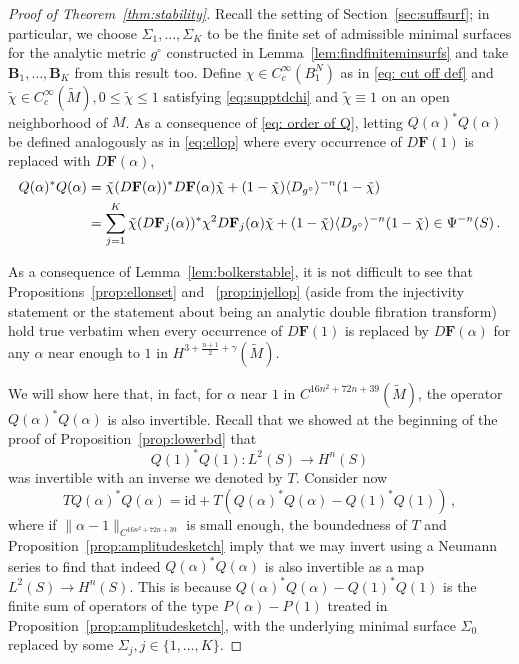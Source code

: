 \documentclass[11pt]{amsart}
\theoremstyle{definition}
\numberwithin{equation}{section}
\newcommand{\norm}[1]{\lVert #1 \rVert}         %
\newcommand{\BB}{\mathbf B}
\begin{document}
\begin{proof}[Proof of Theorem~\ref{thm:stability}]
Recall the setting of Section~\ref{sec:suffsurf}; in particular, we choose $\Sigma_1,\dots,\Sigma_K$ to be the finite set of admissible minimal surfaces for the analytic metric $g^\circ$ constructed in Lemma~\ref{lem:findfiniteminsurfs} and take $\BB_1,\dots,\BB_K$ from this result too. %
Define $\chi\in C^\infty_c(B_1^{N})$ as in \eqref{eq: cut off def} and $\tilde\chi\in C^\infty_c(\widetilde M), 0\leq \tilde{\chi}\leq 1$ satisfying \eqref{eq:supptdchi} and $\tilde{\chi}\equiv 1$ on an open neighborhood of $M$. As a consequence of \eqref{eq: order of Q}, letting $Q(\alpha)^\ast Q(\alpha)$ be defined analogously as in \eqref{eq:ellop} where every occurrence of $D\mathbf{F}(1)$ is replaced with $D\mathbf{F}(\alpha)$,
\begin{align}\label{eq: def Qalpha}
	Q(\alpha)^\ast Q(\alpha) &= \tilde{\chi}(D\mathbf{F}(\alpha))^\ast D\mathbf{F}(\alpha)\tilde{\chi} + (1-\tilde{\chi})\langle D_{g^\circ}\rangle^{-n} (1-\tilde{\chi}) \\
    &= \sum_{j=1}^K \tilde{\chi}(D\mathbf{F}_j(\alpha))^\ast \chi^2 D\mathbf{F}_j(\alpha)\tilde{\chi} + (1-\tilde{\chi})\langle D_{g^\circ}\rangle^{-n} (1-\tilde{\chi}) \in \Psi^{-n}(S)\,.\notag
\end{align}

As a consequence of Lemma~\ref{lem:bolkerstable}, it is not difficult to see that Propositions~\ref{prop:ellonset} and ~\ref{prop:injellop} (aside from the injectivity statement or the statement about being an analytic double fibration transform) hold true verbatim when every occurrence of $D\mathbf{F}(1)$ is replaced by $D\mathbf{F}(\alpha)$ for any $\alpha$ near enough to $1$ in $H^{3+\frac{n+1}{2}+\gamma}(\widetilde{M})$. 

We will show here that, in fact, for $\alpha$ near $1$ in $C^{16n^2+72n+39}(\widetilde{M})$, the operator $Q(\alpha)^\ast Q(\alpha)$ is also invertible. Recall that we showed at the beginning of the proof of Proposition~\ref{prop:lowerbd} that
	\[
		Q(1)^\ast Q(1) \colon L^2(S) \to H^n(S)
	\]
	was invertible with an inverse we denoted by $T$. Consider now
	\[
		T Q(\alpha)^\ast Q(\alpha) = \mathrm{id}+ T(Q(\alpha)^\ast Q(\alpha)- Q(1)^\ast Q(1))\,,
	\]
	where if $\norm{\alpha-1}_{C^{16n^2+72n+39}}$ is small enough, the boundedness of $T$ and Proposition~\ref{prop:amplitudesketch} imply that we may invert using a Neumann series to find that indeed $Q(\alpha)^\ast Q(\alpha)$ is also invertible as a map $L^2(S) \to H^n(S)$. This is because $Q(\alpha)^\ast Q(\alpha)-Q(1)^\ast Q(1)$ is the finite sum of operators of the type $P(\alpha)-P(1)$ treated in Proposition~\ref{prop:amplitudesketch}, with the underlying minimal surface $\Sigma_0$ replaced by some $\Sigma_j, j\in\{1,\dots,K\}$.


\end{proof}
\end{document}
